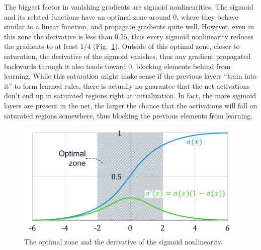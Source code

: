 			The biggest factor in vanishing gradients are sigmoid nonlinearities.
			The sigmoid and its related functions have an optimal zone around $0$, where they behave similar to a linear function, and propagate gradients quite well.
			However, even in this zone the derivative is less than $0.25$, thus every sigmoid nonlinearity reduces the gradients to at least $1/4$ (Fig.~\ref{fig:sigmoid_saturation}).
			Outside of this optimal zone, closer to saturation, the derivative of the sigmoid vanishes, thus any gradient propagated backwards through it also tends toward $0$, blocking elements behind from learning.
			While this saturation might make sense if the previous layers ``train into it'' to form learned rules, there is actually no guarantee that the net activations don't end up in saturated regions right at initialization.
			In fact, the more sigmoid layers are present in the net, the larger the chance that the activations will fall on saturated regions somewhere, thus blocking the previous elements from learning.
			
			\begin{figure}[ht]
				\centering
				\includegraphics[width=0.6\linewidth]{figures/02_deep_learning/sigmoid_saturation/sigmoid_saturation.pdf}
				\caption[Optimal zone of the sigmoid nonlinearity]{The optimal zone and the derivative of the sigmoid nonlinearity.}
				\label{fig:sigmoid_saturation}
			\end{figure}
		
